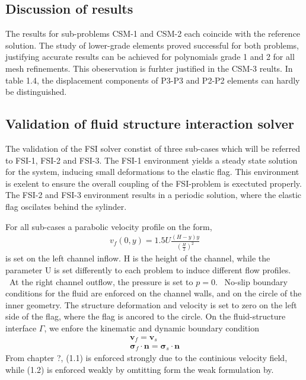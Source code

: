 \subsection{Discussion of results}
The results for sub-problems CSM-1 and CSM-2 each coincide with the reference solution. The study of lower-grade elements proved successful for both problems, justifying accurate results can be achieved for polynomials grade 1 and 2 for all mesh refinements. This obeservation is furhter justified in the CSM-3 reults. In table 1.4, the  displacement components of P3-P3 and P2-P2 elements can hardly be distinguished.


\newpage
\subsection{Validation of fluid structure interaction solver}
The validation of the FSI solver constist of three sub-cases which will be referred to FSI-1, FSI-2 and FSI-3. The FSI-1 environment yields a steady state solution for the system, inducing small deformations to the elastic flag. This environment is exelent to ensure the overall coupling of the FSI-problem is exectuted properly. The FSI-2 and FSI-3 environment results in a periodic solution, where the elastic flag oscilates behind the sylinder.


 For all sub-cases
a parabolic velocity profile on the form,
\begin{align*}
v_f(0, y) = 1.5 U\frac{(H -y)y}{(\frac{H}{2})^2}
\end{align*}
is set on the left channel inflow. H is the height of the channel, while the parameter U is set differently to each problem to induce different flow profiles. \
At the right channel outflow, the pressure is set to $p = 0$. \
No-slip boundary conditions for the fluid are enforced on the channel walls, and on the circle of the inner geometry.
The structure deformation and velocity is set to zero on the left side of the flag, where the flag is ancored to the circle. On the fluid-structure interface $\Gamma$, we enfore the kinematic and dynamic boundary condition
\begin{align}
\mathbf{v}_f = \mathbf{v}_s \\
\mathbf{\sigma}_f \cdot \mathbf{n} = \mathbf{\sigma}_s \cdot \mathbf{n}
\end{align}
From chapter ?,  (1.1) is enforced strongly due to the continious velocity field, while (1.2) is enforced weakly by omtitting form the weak formulation by.



